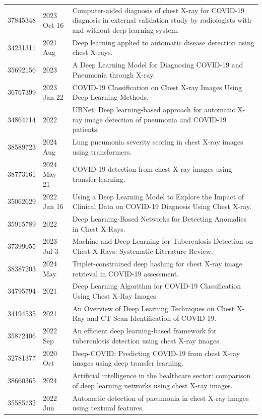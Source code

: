 \begin{longtable}{llp{9.5cm}}
37845348 & 2023 Oct 16 & Computer-aided diagnosis of chest X-ray for COVID-19 diagnosis in external validation study by radiologists with and without deep learning system. \\
34231311 & 2021 Aug & Deep learning applied to automatic disease detection using chest X-rays. \\
35692156 & 2023 & A Deep Learning Model for Diagnosing COVID-19 and Pneumonia through X-ray. \\
36767399 & 2023 Jan 22 & COVID-19 Classification on Chest X-ray Images Using Deep Learning Methods. \\
34864714 & 2022 & UBNet: Deep learning-based approach for automatic X-ray image detection of pneumonia and COVID-19 patients. \\
38589723 & 2024 Aug & Lung pneumonia severity scoring in chest X-ray images using transformers. \\
38773161 & 2024 May 21 & COVID‑19 detection from chest X-ray images using transfer learning. \\
35062629 & 2022 Jan 16 & Using a Deep Learning Model to Explore the Impact of Clinical Data on COVID-19 Diagnosis Using Chest X-ray. \\
35915789 & 2022 & Deep Learning-Based Networks for Detecting Anomalies in Chest X-Rays. \\
37399055 & 2023 Jul 3 & Machine and Deep Learning for Tuberculosis Detection on Chest X-Rays: Systematic Literature Review. \\
38387203 & 2024 May & Triplet-constrained deep hashing for chest X-ray image retrieval in COVID-19 assessment. \\
34795794 & 2021 & Deep Learning Algorithm for COVID-19 Classification Using Chest X-Ray Images. \\
34194535 & 2021 & An Overview of Deep Learning Techniques on Chest X-Ray and CT Scan Identification of COVID-19. \\
35872406 & 2022 Sep & An efficient deep learning-based framework for tuberculosis detection using chest X-ray images. \\
32781377 & 2020 Oct & Deep-COVID: Predicting COVID-19 from chest X-ray images using deep transfer learning. \\
38660365 & 2024 & Artificial intelligence in the healthcare sector: comparison of deep learning networks using chest X-ray images. \\
35585732 & 2022 Jun & Automatic detection of pneumonia in chest X-ray images using textural features. \\

\end{longtable}
